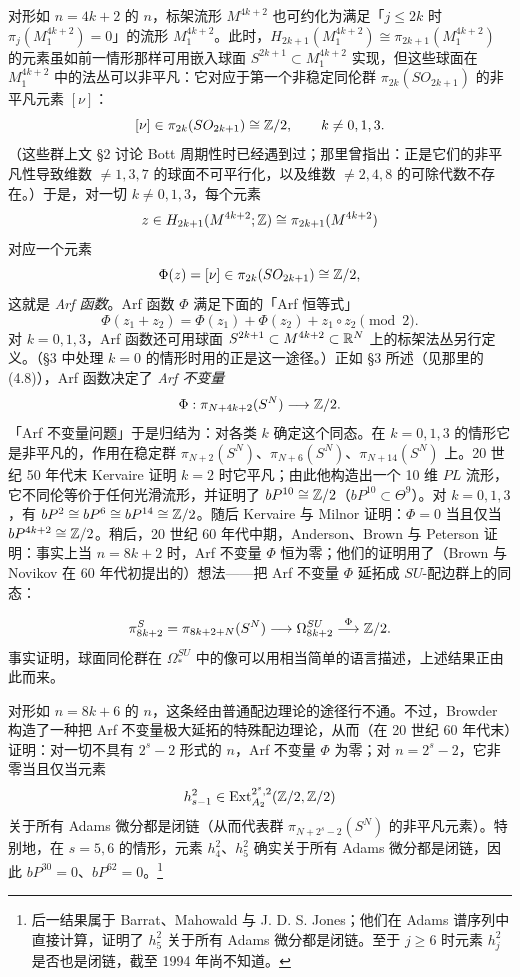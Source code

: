 对形如 $n=4k+2$ 的 $n$，标架流形 $M^{4k+2}$ 也可约化为满足「$j\le2k$ 时 $\pi_j(M^{4k+2}_1)=0$」的流形 $M^{4k+2}_1$。此时，$H_{2k+1}(M^{4k+2}_1)\cong\pi_{2k+1}(M^{4k+2}_1)$ 的元素虽如前一情形那样可用嵌入球面 $S^{2k+1}\subset M^{4k+2}_1$ 实现，但这些球面在 $M^{4k+2}_1$ 中的法丛可以非平凡：它对应于第一个非稳定同伦群 $\pi_{2k}(SO_{2k+1})$ 的非平凡元素 $[\nu]$：
\[
[\nu]\in\pi_{2k}(SO_{2k+1})\cong\mathbb{Z}/2,\qquad k\ne0,1,3.
\]
（这些群上文 §2 讨论 Bott 周期性时已经遇到过；那里曾指出：正是它们的非平凡性导致维数 $\ne1,3,7$ 的球面不可平行化，以及维数 $\ne2,4,8$ 的可除代数不存在。）于是，对一切 $k\ne0,1,3$，每个元素
\[
z\in H_{2k+1}(M^{4k+2};\mathbb{Z})\cong\pi_{2k+1}(M^{4k+2})
\]
对应一个元素
\[
\Phi(z)=[\nu]\in\pi_{2k}(SO_{2k+1})\cong\mathbb{Z}/2,
\]
这就是 \emph{Arf 函数}。Arf 函数 $\Phi$ 满足下面的「Arf 恒等式」
\[
\Phi(z_1+z_2)=\Phi(z_1)+\Phi(z_2)+z_1\circ z_2\pmod2.
\]
对 $k=0,1,3$，Arf 函数还可用球面 $S^{2k+1}\subset M^{4k+2}\subset\mathbb{R}^N$ 上的标架法丛另行定义。（§3 中处理 $k=0$ 的情形时用的正是这一途径。）正如 §3 所述（见那里的 (4.8)），Arf 函数决定了 \emph{Arf 不变量}
\[
\Phi:\pi_{N+4k+2}(S^N)\longrightarrow\mathbb{Z}/2.
\]
「Arf 不变量问题」于是归结为：对各类 $k$ 确定这个同态。在 $k=0,1,3$ 的情形它是非平凡的，作用在稳定群 $\pi_{N+2}(S^N)$、$\pi_{N+6}(S^N)$、$\pi_{N+14}(S^N)$ 上。20 世纪 50 年代末 Kervaire 证明 $k=2$ 时它平凡；由此他构造出一个 10 维 $PL$ 流形，它不同伦等价于任何光滑流形，并证明了 $bP^{10}\cong\mathbb{Z}/2$（$bP^{10}\subset\Theta^9$）。对 $k=0,1,3$，有 $bP^2\cong bP^6\cong bP^{14}\cong\mathbb{Z}/2$。随后 Kervaire 与 Milnor 证明：$\Phi=0$ 当且仅当 $bP^{4k+2}\cong\mathbb{Z}/2$。稍后，20 世纪 60 年代中期，Anderson、Brown 与 Peterson 证明：事实上当 $n=8k+2$ 时，Arf 不变量 $\Phi$ 恒为零；他们的证明用了（Brown 与 Novikov 在 60 年代初提出的）想法——把 Arf 不变量 $\Phi$ 延拓成 $SU$-配边群上的同态：


\[
\pi^S_{8k+2}=\pi_{8k+2+N}(S^N)\longrightarrow\Omega^{SU}_{8k+2}\overset{\Phi}{\longrightarrow}\mathbb{Z}/2.
\]
事实证明，球面同伦群在 $\Omega^{SU}_*$ 中的像可以用相当简单的语言描述，上述结果正由此而来。

对形如 $n=8k+6$ 的 $n$，这条经由普通配边理论的途径行不通。不过，Browder 构造了一种把 Arf 不变量极大延拓的特殊配边理论，从而（在 20 世纪 60 年代末）证明：对一切不具有 $2^s-2$ 形式的 $n$，Arf 不变量 $\Phi$ 为零；对 $n=2^s-2$，它非零当且仅当元素
\[
h^2_{s-1}\in\operatorname{Ext}^{2^s,2}_{A_2}(\mathbb{Z}/2,\mathbb{Z}/2)
\]
关于所有 Adams 微分都是闭链（从而代表群 $\pi_{N+2^s-2}(S^N)$ 的非平凡元素）。特别地，在 $s=5,6$ 的情形，元素 $h^2_4$、$h^2_5$ 确实关于所有 Adams 微分都是闭链，因此 $bP^{30}=0$、$bP^{62}=0$。\footnote{后一结果属于 Barrat、Mahowald 与 J. D. S. Jones；他们在 Adams 谱序列中直接计算，证明了 $h^2_5$ 关于所有 Adams 微分都是闭链。至于 $j\ge6$ 时元素 $h^2_j$ 是否也是闭链，截至 1994 年尚不知道。}

